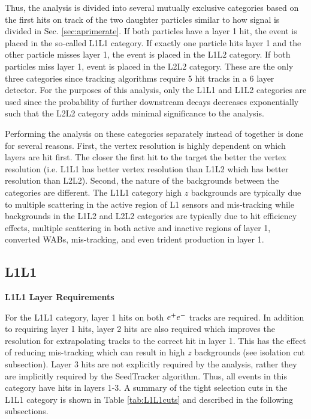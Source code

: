 Thus, the analysis is divided into several mutually exclusive categories based on the first hits on track of the two daughter particles similar to how signal is divided in Sec. \ref{sec:aprimerate}. If both particles have a layer 1 hit, the event is placed in the so-called L1L1 category. If exactly one particle hits layer 1 and the other particle misses layer 1, the event is placed in the L1L2 category. If both particles miss layer 1, event is placed in the L2L2 category. These are the only three categories since tracking algorithms require 5 hit tracks in a 6 layer detector. For the purposes of this analysis, only the L1L1 and L1L2 categories are used since the probability of further downstream decays decreases exponentially such that the L2L2 category adds minimal significance to the analysis. 

Performing the analysis on these categories separately instead of together is done for several reasons. First, the vertex resolution is highly dependent on which layers are hit first. The closer the first hit to the target the better the vertex resolution (i.e. L1L1 has better vertex resolution than L1L2 which has better resolution than L2L2). Second, the nature of the backgrounds between the categories are different. The L1L1 category high $z$ backgrounds are typically due to multiple scattering in the active region of L1 sensors and mis-tracking while backgrounds in the L1L2 and L2L2 categories are typically due to hit efficiency effects, multiple scattering in both active and inactive regions of layer 1, converted WABs, mis-tracking, and even trident production in layer 1. 

\clearpage

\subsection{L1L1}\label{sec:apL1L1}

\textbf{L1L1 Layer Requirements}

For the L1L1 category, layer 1 hits on both $e^{+}e^{-}$ tracks are required. In addition to requiring layer 1 hits, layer 2 hits are also required which improves the resolution for extrapolating tracks to the correct hit in layer 1. This has the effect of reducing mis-tracking which can result in high $z$ backgrounds (see isolation cut subsection). Layer 3 hits are not explicitly required by the analysis, rather they are implicitly required by the SeedTracker algorithm. Thus, all events in this category have hits in layers 1-3. %
A summary of the tight selection cuts in the L1L1 category is shown in Table \ref{tab:L1L1cuts} and described in the following subsections.


